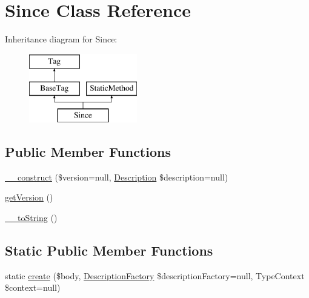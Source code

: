 \hypertarget{classphp_documentor_1_1_reflection_1_1_doc_block_1_1_tags_1_1_since}{}\section{Since Class Reference}
\label{classphp_documentor_1_1_reflection_1_1_doc_block_1_1_tags_1_1_since}
Inheritance diagram for Since\+:\begin{figure}[H]
\begin{center}
\leavevmode
\includegraphics[height=3.000000cm]{classphp_documentor_1_1_reflection_1_1_doc_block_1_1_tags_1_1_since}
\end{center}
\end{figure}
\subsection*{Public Member Functions}
\begin{DoxyCompactItemize}
\item 
\mbox{\hyperlink{classphp_documentor_1_1_reflection_1_1_doc_block_1_1_tags_1_1_since_a75f67561d733f42ea52230c5b289d264}{\+\_\+\+\_\+construct}} (\$version=null, \mbox{\hyperlink{classphp_documentor_1_1_reflection_1_1_doc_block_1_1_description}{Description}} \$description=null)
\item 
\mbox{\hyperlink{classphp_documentor_1_1_reflection_1_1_doc_block_1_1_tags_1_1_since_afa8e7a3a646144eab50188b7a805a389}{get\+Version}} ()
\item 
\mbox{\hyperlink{classphp_documentor_1_1_reflection_1_1_doc_block_1_1_tags_1_1_since_a7516ca30af0db3cdbf9a7739b48ce91d}{\+\_\+\+\_\+to\+String}} ()
\end{DoxyCompactItemize}
\subsection*{Static Public Member Functions}
\begin{DoxyCompactItemize}
\item 
static \mbox{\hyperlink{classphp_documentor_1_1_reflection_1_1_doc_block_1_1_tags_1_1_since_a11e724d29317978c2b5add32da21a158}{create}} (\$body, \mbox{\hyperlink{classphp_documentor_1_1_reflection_1_1_doc_block_1_1_description_factory}{Description\+Factory}} \$description\+Factory=null, Type\+Context \$context=null)
\end{DoxyCompactItemize}
